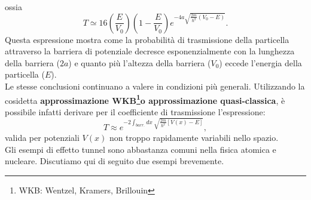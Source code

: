 ossia
\begin{equation}
T \simeq 16 \left(\frac{E}{V_0} \right) \left(1-\frac{E}{V_0}\right) e^{-4a\sqrt{\frac{2m}{\hbar ^2}\left(V_0-E\right)}}.
\end{equation}
Questa espressione mostra come la probabilità di trasmissione della particella attraverso la barriera di potenziale decresce esponenzialmente con la lunghezza della barriera ($2a$) e quanto più l'altezza della barriera ($V_0$) eccede l'energia della particella ($E$).\\
Le stesse conclusioni continuano a valere in condizioni più generali. Utilizzando la cosidetta \textbf{approssimazione WKB\footnote{WKB: Wentzel, Kramers, Brillouin}o approssimazione quasi-classica}, è possibile infatti derivare per il coefficiente di trasmissione l'espressione:
\begin{equation}
T \approx e^{-2 \int_{barr.} dx\ \sqrt{\frac{2m}{\hbar ^2}\left[ V(x)-E \right]}},
\end{equation}
valida per potenziali $V(x)$ non troppo rapidamente variabili nello spazio.\\
Gli esempi di effetto tunnel sono abbastanza comuni nella fisica atomica e nucleare. Discutiamo qui di seguito due esempi brevemente.
